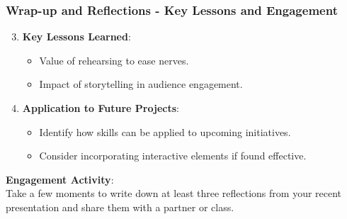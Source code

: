 \documentclass{beamer}
\begin{document}
\begin{frame}[fragile]
    \frametitle{Wrap-up and Reflections - Key Lessons and Engagement}
    \begin{enumerate}
        \setcounter{enumi}{2}
        \item \textbf{Key Lessons Learned}:
            \begin{itemize}
                \item Value of rehearsing to ease nerves.
                \item Impact of storytelling in audience engagement.
            \end{itemize}
        \item \textbf{Application to Future Projects}:
            \begin{itemize}
                \item Identify how skills can be applied to upcoming initiatives.
                \item Consider incorporating interactive elements if found effective.
            \end{itemize}
    \end{enumerate}
    
    \textbf{Engagement Activity}:\\
    Take a few moments to write down at least three reflections from your recent presentation and share them with a partner or class.
\end{frame}
\end{document}

